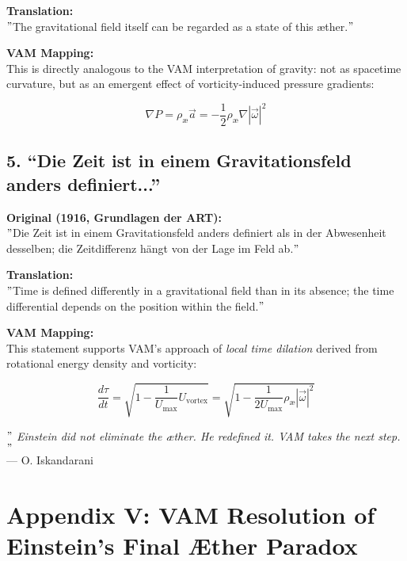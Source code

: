 \documentclass[preprint]{revtex4-2}
\renewcommand{\grqq}{``}
\begin{document}
    \textbf{Translation:} \\
    \("\)The gravitational field itself can be regarded as a state of this æther.\("\)

    \textbf{VAM Mapping:} \\
    This is directly analogous to the VAM interpretation of gravity: not as spacetime curvature, but as an emergent effect of vorticity-induced pressure gradients:

    \[
    \nabla P = \rho_\text{\ae} \vec{a} = -\frac{1}{2} \rho_\text{\ae} \nabla |\vec{\omega}|^2
    \]

    \subsection*{5. \grqq Die Zeit ist in einem Gravitationsfeld anders definiert...\textquotedblright}
    \textbf{Original (1916, Grundlagen der ART):} \\
    \("\)Die Zeit ist in einem Gravitationsfeld anders definiert als in der Abwesenheit desselben; die Zeitdifferenz hängt von der Lage im Feld ab.\("\)

    \textbf{Translation:} \\
    \("\)Time is defined differently in a gravitational field than in its absence; the time differential depends on the position within the field.\("\)

    \textbf{VAM Mapping:} \\
    This statement supports VAM's approach of \emph{local time dilation} derived from rotational energy density and vorticity:

    \[
    \frac{d\tau}{dt} = \sqrt{1 - \frac{1}{U_\text{max}} U_{\text{vortex}}} = \sqrt{1 - \frac{1}{2U_\text{max}} \rho_\text{\ae} |\vec{\omega}|^2}
    \]

    \bigskip
    \textit{ \("\) Einstein did not eliminate the æther. He redefined it. VAM takes the next step. \("\)}\\
    \hfill — O. Iskandarani\\

\section*{Appendix V: VAM Resolution of Einstein’s Final Æther Paradox}
\label{appendix:final-aether}

    \vspace{-0.5em}
\end{document}
